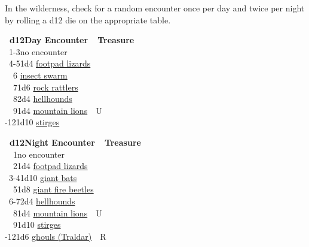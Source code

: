 \documentclass[english,11pt,openany,letterpaper,twocolumn]{book}
\begin{document}
In the wilderness, check for a random encounter once per day and twice per night by rolling a d12 die on the appropriate table.

\skipline

\ulf\textbf{~d12\tab Day Encounter~~Treasure}\\
~1-3\tab	no encounter\\
~4-5\tab	1d4 \hyperlink{lizard}{footpad lizards}\\
~~6\tab{} \hyperlink{swarm}{insect swarm}\\
~~7\tab\tab	1d6 \hyperlink{rattler}{rock rattlers}\\
~~8\tab\tab	2d4 \hyperlink{hellhound}{hellhounds}\\
~~9\tab\tab	1d4 \hyperlink{lion}{mountain lions}~~U\\
-12\tab	1d10 \hyperlink{stirge}{stirges}\\

\skipline

\ulf\textbf{~d12\tab Night Encounter~~Treasure}\\
~~1\tab\tab	no encounter\\
~~2\tab\tab	1d4 \hyperlink{lizard}{footpad lizards}\\
~3-4\tab	1d10 \hyperlink{bat}{giant bats}\\
~~5\tab\tab	1d8 \hyperlink{beetle}{giant fire beetles}\\
~6-7\tab	2d4 \hyperlink{hellhound}{hellhounds}\\
~~8\tab\tab	1d4 \hyperlink{lion}{mountain lions}~~U\\
~~9\tab\tab	1d10 \hyperlink{stirge}{stirges}\\
-12\tab	1d6 \hyperlink{ghoul}{ghouls (Traldar)}~~R\\

\break
\cleartorightpage
\thispagestyle{empty}

~\vfill

\noindent
\begin{minipage}{\textwidth}
	\setmonofont{TruetypewriterPolyglOTT}
	\hspace*{-7pt}
\end{minipage}

\vfill

\break

\break
\cleartoleftpage

\thispagestyle{empty}
\end{document}
